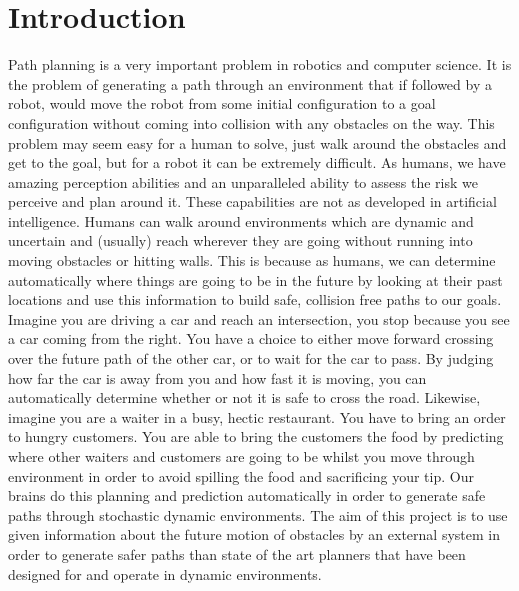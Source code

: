 


\chapter{Introduction}

\label{chapter:introduction}

Path planning is a very important problem in robotics and computer science. It
is the problem of generating a path through an environment that if followed by
a robot, would move the robot from some initial configuration to a goal
configuration without coming into collision with any obstacles on the way. This
problem may seem easy for a human to solve, just walk around the obstacles and
get to the goal, but for a robot it can be extremely difficult. As humans, we
have amazing perception abilities and an unparalleled ability to assess the
risk we perceive and plan around it. These capabilities are not as developed in
artificial intelligence. Humans can walk around environments which are dynamic
and uncertain and (usually) reach wherever they are going without running into
moving obstacles or hitting walls. This is because as humans, we can determine
automatically where things are going to be in the future by looking at their
past locations and use this information to build safe, collision free paths to
our goals. Imagine you are driving a car and reach an intersection, you stop
because you see a car coming from the right. You have a choice to either move
forward crossing over the future path of the other car, or to wait for the car
to pass. By judging how far the car is away from you and how fast it is moving,
you can automatically determine whether or not it is safe to cross the road.
Likewise, imagine you are a waiter in a busy, hectic restaurant. You have to
bring an order to hungry customers. You are able to bring the customers the
food by predicting where other waiters and customers are going to be whilst you
move through environment in order to avoid spilling the food and sacrificing
your tip. Our brains do this planning and prediction automatically in order to
generate safe paths through stochastic dynamic environments. The aim of this
project is to use given information about the future motion of obstacles by an
external system in order to generate safer paths than state of the art planners
that have been designed for and operate in dynamic environments.

